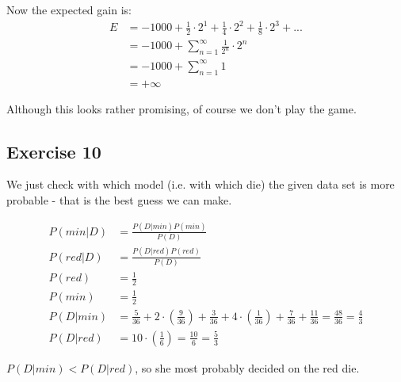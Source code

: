 \documentclass[../main/Notes.tex]{subfiles}
\begin{document}
Now the expected gain is:
\begin{align*}
E &= -1000 + \frac{1}{2} \cdot 2^1 + \frac{1}{4} \cdot 2^2 + \frac{1}{8} \cdot 2^3 + ... \\
  &= -1000 + \sum\limits_{n=1}^\infty \frac{1}{2^n} \cdot 2^n \\
  &= -1000 + \sum\limits_{n=1}^\infty 1 \\
  &= +\infty
\end{align*}

Although this looks rather promising, of course we don't play the game.

\subsection*{Exercise 10}
We just check with which model (i.e. with which die) the given data set is more probable - that is the best guess we can make.

\begin{align*}
P(min|D) &= \frac{P(D|min)P(min)}{P(D)} \\
P(red|D) &= \frac{P(D|red)P(red)}{P(D)} \\
P(red)   &= \frac{1}{2}  \\
P(min)   &= \frac{1}{2}  \\
P(D|min) &= \frac{5}{36} 
      + 2 \cdot \left(\frac{9}{36}\right)
      + \frac{3}{36}
      + 4 \cdot \left( \frac{1}{36} \right)
      + \frac{7}{36}
      + \frac{11}{36}
      = \frac{48}{36} = \frac{4}{3} \\
P(D|red) &= 10 \cdot \left(\frac{1}{6}\right) = \frac{10}{6} = \frac{5}{3}
\end{align*}

$P(D|min) < P(D|red)$, so she most probably decided on the red die.
\end{document}
